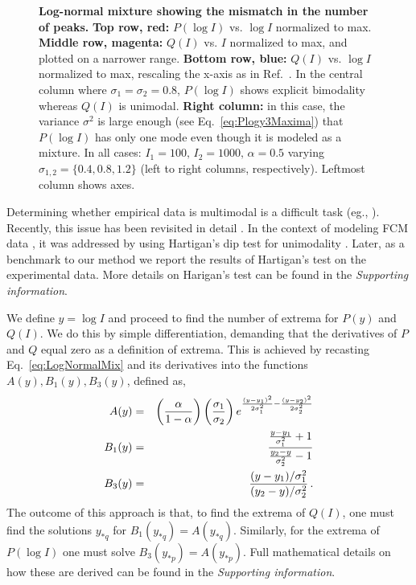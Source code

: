 \documentclass[11pt,a4paper,draft]{article}
\begin{document}
\begin{figure}[!ht]
 \centering
  \caption{\textbf{Log-normal mixture showing the mismatch in the number of peaks.} \textbf{Top row, red:} $P(\log I)$ vs. $\log I$ normalized to max. \textbf{Middle row, magenta:} $Q(I)$ vs. $I$ normalized to max, and plotted on a narrower range. \textbf{Bottom row, blue:} $Q(I)$ vs. $\log I$ normalized to max, rescaling the x-axis as in Ref.~\cite{Novo2008}. In the central column where $\sigma_1=\sigma_2=0.8$, $P(\log I)$ shows explicit bimodality whereas $Q(I)$ is unimodal. \textbf{Right column:} in this case, the variance $\sigma^2$ is large enough (see Eq.~\ref{eq:Plogy3Maxima}) that $P(\log I)$ has only one mode even though it is modeled as a mixture. In all cases: $I_1=100,\,I_2=1000,\,\alpha=0.5$ varying $\sigma_{1,2}=\{0.4,0.8,1.2\}$ (left to right columns, respectively). Leftmost column shows axes. }
  \label{fig:PlotsLinearLog}
\end{figure}

Determining whether empirical data is multimodal is a difficult task (eg., \cite{Silverman1981}). Recently, this issue has been revisited in detail \cite{Johnsson2017}. In the context of modeling FCM data \cite{Das2009}, it was addressed by using Hartigan's dip test for unimodality \cite{Hartigan1985}. Later, as a benchmark to our method we report the results of Hartigan's test on the experimental data. More details on Harigan's test can be found in the \emph{Supporting information}.
\smallskip

We define $y=\log I$ and proceed to find the number of extrema for $P(y)$ and $Q(I)$. We do this by simple differentiation, demanding that the derivatives of $P$ and $Q$ equal zero as a definition of extrema. This is achieved by recasting Eq.~\ref{eq:LogNormalMix} and its derivatives into the functions $A(y),B_1(y),B_3(y)$, defined as,
\begin{eqnarray} 
\label{eq:extrema}
A(y) &=& \left(\frac{\alpha}{1-\alpha}\right)\left(\frac{\sigma_1}{\sigma_2}\right) e^{\frac{(y-y_1)^2}{2 \sigma_1^2}-\frac{(y-y_2)^2}{2 \sigma_2^2}}  \\ \nonumber
B_1(y) &=& \frac{\frac{y-y_1}{\sigma_1^2}+1}{\frac{y_2-y}{\sigma_2^2}-1} \\ \nonumber
B_3(y) &=& \frac{(y-y_1)/\sigma_1^2}{(y_2-y)/\sigma_2^2}\,.
\end{eqnarray}
The outcome of this approach is that, to find the extrema of $Q(I)$, one must find the solutions $y_{*q}$ for $B_1(y_{*q})=A(y_{*q})$. Similarly, for the extrema of $P(\log I)$ one must solve $B_3(y_{*p})=A(y_{*p})$. Full mathematical details on how these are derived can be found in the \emph{Supporting information}. 
\end{document}
